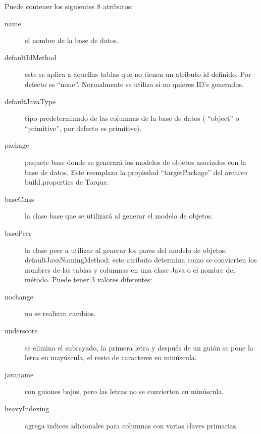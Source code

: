 Puede contener los siguientes 8 atributos:

\begin{description}
	\item[name] el nombre de la base de datos.
	\item[defaultIdMethod] este se aplica a aquellas tablas que no tienen un atributo id definido. Por defecto es “none”. Normalmente se utiliza si no quieres ID’s generados.
	\item[defaultJavaType] tipo predeterminado de las columnas de la base de datos ( “object” o “primitive”, por defecto es primitive).
	\item[package] paquete base donde se generará los modelos de objetos asociados con la base de datos. Este reemplaza la propiedad “targetPackage” del archivo build.properties de Torque.
	\item[baseClass] la clase base que se utilizará al generar el modelo de objetos.
	\item[basePeer] la clase peer a utilizar al generar los pares del modelo de objetos.
	defaultJavaNamingMethod: este atributo determina como se convierten los nombres de las tablas y columnas en una clase Java o el nombre del método. Puede tener 3 valores diferentes:
	\item[nochange] no se realizan cambios.
	\item[underscore] se elimina el subrayado, la primera letra y después de un guión se pone la letra en mayúscula, el resto de caracteres en minúscula.
	\item[javaname] con guiones bajos, pero las letras no se convierten en minúscula.
	\item[heavyIndexing] agrega indices adicionales para columnas con varias claves primarias.
\end{description}